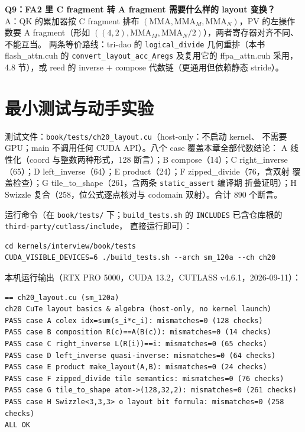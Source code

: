 \begin{sloppypar}
\textbf{Q9：FA2 里 C fragment 转 A fragment 需要什么样的 layout 变换？}\\
A：QK 的累加器按 C fragment 排布 $(\mathrm{MMA},\mathrm{MMA}_M,
\mathrm{MMA}_N)$，PV 的左操作数要 A fragment（形如
$((4,2),\mathrm{MMA}_M,\mathrm{MMA}_N/2)$），两者寄存器对齐不同、不能互当。
两条等价路线：tri-dao 的 \texttt{logical\_\allowbreak{}divide} 几何重排（本书
flash\_attn.cuh 的 \texttt{convert\_\allowbreak{}layout\_\allowbreak{}}\allowbreak\texttt{acc\_Aregs}
及复用它的 ffpa\_attn.cuh 采用，4.8 节），或 reed 的 inverse $+$ compose
代数链（更通用但依赖静态 stride）。
\end{sloppypar}

\section{最小测试与动手实验}

测试文件：\texttt{book/\allowbreak{}tests/\allowbreak{}ch20\_\allowbreak{}layout.\allowbreak{}cu}（host-only：不启动 kernel、
不需要 GPU；main 不调用任何 CUDA API）。八个 case 覆盖本章全部代数结论：
A 线性化（coord 与整数两种形式，128 断言）；B compose（14）；C right\_inverse
（65）；D left\_inverse（64）；E product（24）；F zipped\_divide（76，含双射
覆盖检查）；G tile\_to\_shape（261，含两条 \texttt{static\_\allowbreak{}assert} 编译期
折叠证明）；H Swizzle 复合（258，位公式逐点核对与 codomain 双射）。合计
890 个断言。

运行命令（在 \texttt{book/tests/} 下；\texttt{build\_\allowbreak{}tests.\allowbreak{}sh} 的
\texttt{INCLUDES} 已含仓库根的 \texttt{third-party/\allowbreak{}cutlass/\allowbreak{}include}，
直接运行即可）：

\begin{lstlisting}[style=console]
cd kernels/interview/book/tests
CUDA_VISIBLE_DEVICES=6 ./build_tests.sh --arch sm_120a --ch ch20
\end{lstlisting}

本机运行输出（RTX PRO 5000，CUDA 13.2，CUTLASS v4.6.1，2026-09-11）：

\begin{lstlisting}[style=console]
== ch20_layout.cu (sm_120a)
ch20 CuTe layout basics & algebra (host-only, no kernel launch)
PASS case A colex idx=sum(s_i*c_i): mismatches=0 (128 checks)
PASS case B composition R(c)==A(B(c)): mismatches=0 (14 checks)
PASS case C right_inverse L(R(i))==i: mismatches=0 (65 checks)
PASS case D left_inverse quasi-inverse: mismatches=0 (64 checks)
PASS case E product make_layout(A,B): mismatches=0 (24 checks)
PASS case F zipped_divide tile semantics: mismatches=0 (76 checks)
PASS case G tile_to_shape atom->(128,32,2): mismatches=0 (261 checks)
PASS case H Swizzle<3,3,3> o layout bit formula: mismatches=0 (258 checks)
ALL OK
\end{lstlisting}

